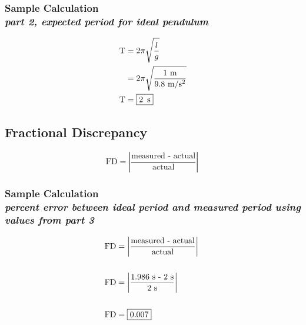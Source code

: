 \vspace{-1.0cm}

\subsubsection{Sample Calculation \\ {\normalfont \small\textit{part 2, expected period for ideal pendulum}}}

{\centering
\begin{align*}
	\text{T} &= 2\pi \sqrt{\frac{l}{g}} \\
					 &= 2\pi \sqrt{\frac{1\text{ m}}{9.8\text{ m/s\textsuperscript{2}}}} \\
	\text{T}  &= \boxed{2\,\text{ s}}
\end{align*}}




\subsection{Fractional Discrepancy}
\vspace{0.5cm}
\begin{equation}
	\text{FD}	= \left| \frac{\text{measured - actual}}{\text{actual}} \right|\
	\label{eq:fdisc}
\end{equation}

\subsubsection{Sample Calculation \\ {\normalfont \small\textit{percent error between ideal period and measured period using values from part 3}}}

\begin{align*}
	\text{FD}	&= \left| \frac{\text{measured - actual}}{\text{actual}} \right|\ \\ \\
	\text{FD}	&= \left| \frac{\text{1.986\text{ s} - 2\text{ s}}}{\text{2\text{ s}}} \right|\ \\ \\
	\text{FD} &= \boxed{0.007} 
\end{align*}

